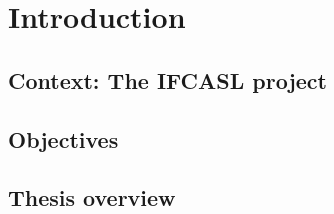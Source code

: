 %
%
\chapter{Introduction}
\label{chap:intro}





\section{Context: The IFCASL project}
\label{sec:intro:ifcasl}

\section{Objectives}
\label{sec:intro:objectives}

\section{Thesis overview}
\label{sec:intro:overview}



